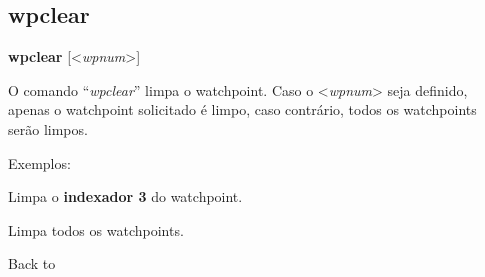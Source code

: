 \documentclass[letterpaper,10pt,brazil]{sphinxmanual}
\begin{document}
\subsection{wpclear}
\label{debugger/watchpoint:debugger-command-wpclear}\label{debugger/watchpoint:wpclear}
\begin{DUlineblock}{0em}
\item[]
\begin{DUlineblock}{\DUlineblockindent}
\item[] \textbf{wpclear} {[}\textless{}\emph{wpnum}\textgreater{}{]}
\item[] 
\end{DUlineblock}
\item[] O comando ``\emph{wpclear}'' limpa o watchpoint. Caso o \textless{}\emph{wpnum}\textgreater{} seja definido, apenas o watchpoint solicitado é limpo, caso contrário, todos os watchpoints serão limpos.
\item[] 
\item[] Exemplos:
\item[] 
\item[]
\begin{DUlineblock}{\DUlineblockindent}
\item[] 
\item[] 
\end{DUlineblock}
\item[] Limpa o \textbf{indexador 3} do watchpoint.
\item[] 
\item[]
\begin{DUlineblock}{\DUlineblockindent}
\item[] 
\item[] 
\end{DUlineblock}
\item[] Limpa todos os watchpoints.
\item[] 
\item[] Back to {\hyperref[debugger/watchpoint:debugger\string-watchpoints\string-list]{}}
\end{DUlineblock}
\begin{quote}
\label{debugger/watchpoint:debugger-command-wpdisable}\end{quote}
\end{document}
